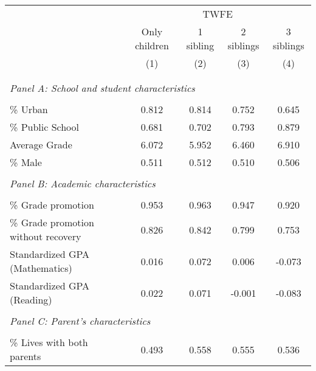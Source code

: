 \makeatletter
{}
{
\makeatother
\begin{tabular}{lcccc}
\toprule
\cmidrule(lr){2-4}
& \multicolumn{4}{c}{TWFE}  \\
\cmidrule(lr){2-4}
& Only children & 1 sibling & 2 siblings & 3 siblings  \\
\cmidrule(lr){2-2} \cmidrule(lr){3-3} \cmidrule(lr){4-4} \cmidrule(lr){5-5}
& (1) & (2) & (3) & (4)\\
\bottomrule
&  &  &  & \\
&  &  &   \\
\multicolumn{4}{l}{\textit{Panel A: School and student characteristics}} \\
            &            &            &            &            \\
\% Urban    &       0.812&       0.814&       0.752&       0.645\\
\% Public School&       0.681&       0.702&       0.793&       0.879\\
Average Grade&       6.072&       5.952&       6.460&       6.910\\
\% Male     &       0.511&       0.512&       0.510&       0.506\\
&  &  &   \\
\multicolumn{4}{l}{\textit{Panel B: Academic characteristics}} \\
            &            &            &            &            \\
\% Grade promotion&       0.953&       0.963&       0.947&       0.920\\
\% Grade promotion without recovery&       0.826&       0.842&       0.799&       0.753\\
Standardized GPA (Mathematics) &       0.016&       0.072&       0.006&      -0.073\\
Standardized GPA (Reading)&       0.022&       0.071&      -0.001&      -0.083\\
&  &  &   \\
\multicolumn{4}{l}{\textit{Panel C: Parent's characteristics}} \\
            &            &            &            &            \\
\% Lives with both parents&       0.493&       0.558&       0.555&       0.536\\

\end{tabular}}
